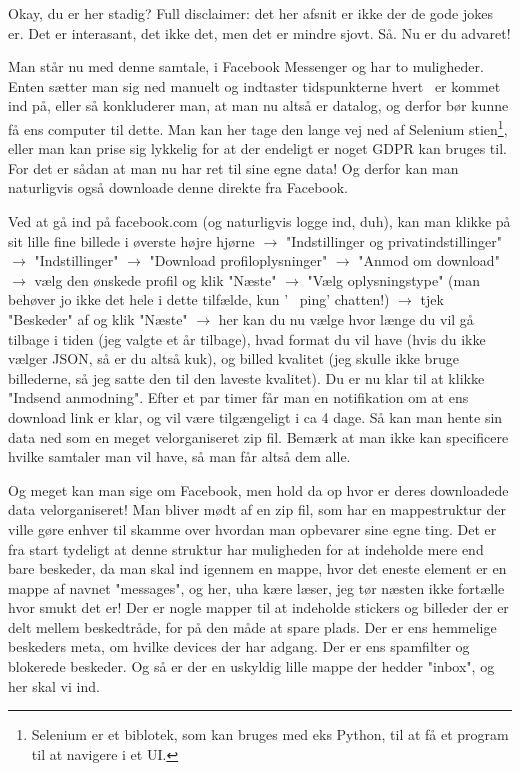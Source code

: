 \documentclass{article}
\newlength\myheight
\newlength\mydepth
\newcommand*\inlinegraphics[1]{%
  \settototalheight\myheight{Xygp}%
  \settodepth\mydepth{Xygp}%
  \raisebox{-\mydepth}{\texttt{[image: \#1]}}%
}
\newcommand{\coffee}[0]{\inlinegraphics{coffee.png}}
\begin{document}
Okay, du er her stadig? Full disclaimer: det her afsnit er ikke der de gode jokes er. Det er interasant, det ikke det, men det er mindre sjovt. Så. Nu er du advaret!

Man står nu med denne samtale, i Facebook Messenger og har to muligheder. Enten sætter man sig ned manuelt og indtaster tidspunkterne hvert \coffee\ er kommet ind på, eller så konkluderer man, at man nu altså er datalog, og derfor bør kunne få ens computer til dette. Man kan her tage den lange vej ned af Selenium stien\footnote{Selenium er et biblotek, som kan bruges med eks Python, til at få et program til at navigere i et UI.}, eller man kan prise sig lykkelig for at der endeligt er noget GDPR kan bruges til. For det er sådan at man nu har ret til sine egne data! Og derfor kan man naturligvis også downloade denne direkte fra Facebook.

Ved at gå ind på facebook.com (og naturligvis logge ind, duh), kan man klikke på sit lille fine billede i øverste højre hjørne $\rightarrow$ "Indstillinger og privatindstillinger" $\rightarrow$ "Indstillinger" $\rightarrow$ "Download profiloplysninger" $\rightarrow$ "Anmod om download" $\rightarrow$ vælg den ønskede profil og klik "Næste" $\rightarrow$ "Vælg oplysningstype" (man behøver jo ikke det hele i dette tilfælde, kun '\coffee\ ping' chatten!) $\rightarrow$ tjek "Beskeder" af og klik "Næste" $\rightarrow$ her kan du nu vælge hvor længe du vil gå tilbage i tiden (jeg valgte et år tilbage), hvad format du vil have (hvis du ikke vælger JSON, så er du altså kuk), og billed kvalitet (jeg skulle ikke bruge billederne, så jeg satte den til den laveste kvalitet). Du er nu klar til at klikke "Indsend anmodning". Efter et par timer får man en notifikation om at ens download link er klar, og vil være tilgængeligt i ca 4 dage. Så kan man hente sin data ned som en meget velorganiseret zip fil. Bemærk at man ikke kan specificere hvilke samtaler man vil have, så man får altså dem alle.

Og meget kan man sige om Facebook, men hold da op hvor er deres downloadede data velorganiseret! Man bliver mødt af en zip fil, som har en mappestruktur der ville gøre enhver til skamme over hvordan man opbevarer sine egne ting. Det er fra start tydeligt at denne struktur har muligheden for at indeholde mere end bare beskeder, da man skal ind igennem en mappe, hvor det eneste element er en mappe af navnet "messages", og her, uha kære læser, jeg tør næsten ikke fortælle hvor smukt det er!
Der er nogle mapper til at indeholde stickers og billeder der er delt mellem beskedtråde, for på den måde at spare plads. Der er ens hemmelige beskeders meta, om hvilke devices der har adgang. Der er ens spamfilter og blokerede beskeder. Og så er der en uskyldig lille mappe der hedder "inbox", og her skal vi ind.
\end{document}
